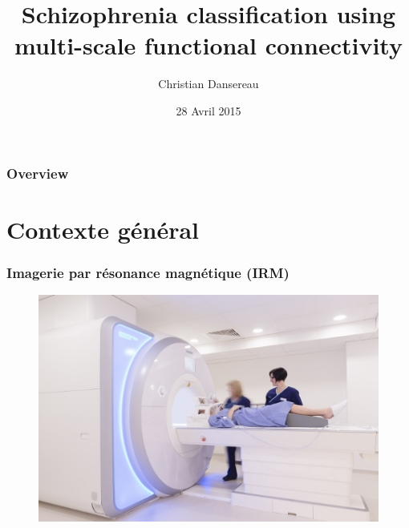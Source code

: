 \documentclass{beamer}
\title[Schizophrenia classification]{Schizophrenia classification using \\multi-scale functional connectivity } %
\author{Christian Dansereau} %
\institute[DIRO] %
{
Université de Montréal \\ %
\medskip
}
\date{28 Avril 2015} %
\begin{document}
\begin{frame}
\titlepage %
\end{frame}

\begin{frame}
\frametitle{Overview} %
\tableofcontents %
\end{frame}


\section{Contexte général} 


\begin{frame}
\frametitle{Imagerie par résonance magnétique (IRM)}
\begin{figure}
\begin{center}
\includegraphics[width=0.7\linewidth]{../figures/scanner.jpg}
\end{center}
\end{figure}
\end{frame}
\end{document}
